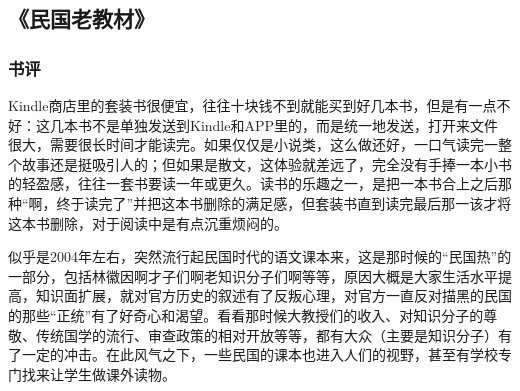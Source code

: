 \subsection{《民国老教材》}

\subsubsection{书评}

Kindle商店里的套装书很便宜，往往十块钱不到就能买到好几本书，但是有一点不好：这几本书不是单独发送到Kindle和APP里的，而是统一地发送，打开来文件很大，需要很长时间才能读完。如果仅仅是小说类，这么做还好，一口气读完一整个故事还是挺吸引人的；但如果是散文，这体验就差远了，完全没有手捧一本小书的轻盈感，往往一套书要读一年或更久。读书的乐趣之一，是把一本书合上之后那种“啊，终于读完了”并把这本书删除的满足感，但套装书直到读完最后那一该才将这本书删除，对于阅读中是有点沉重烦闷的。

似乎是2004年左右，突然流行起民国时代的语文课本来，这是那时候的“民国热”的一部分，包括林徽因啊才子们啊老知识分子们啊等等，原因大概是大家生活水平提高，知识面扩展，就对官方历史的叙述有了反叛心理，对官方一直反对描黑的民国的那些“正统”有了好奇心和渴望。看看那时候大教授们的收入、对知识分子的尊敬、传统国学的流行、审查政策的相对开放等等，都有大众（主要是知识分子）有了一定的冲击。在此风气之下，一些民国的课本也进入人们的视野，甚至有学校专门找来让学生做课外读物。

